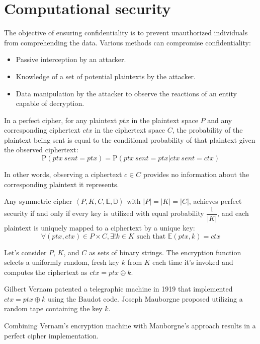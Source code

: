 \section{Computational security}

The objective of ensuring confidentiality is to prevent unauthorized individuals from comprehending the data. 
Various methods can compromise confidentiality:
\begin{itemize}
    \item Passive interception by an attacker.
    \item Knowledge of a set of potential plaintexts by the attacker.
    \item Data manipulation by the attacker to observe the reactions of an entity capable of decryption.
\end{itemize}

\begin{definition}
    In a perfect cipher, for any plaintext $ptx$ in the plaintext space $P$ and any corresponding ciphertext $ctx$ in the ciphertext space $C$, the probability of the plaintext being sent is equal to the conditional probability of that plaintext given the observed ciphertext:
    \[\text{P}(ptx\:sent=ptx)=\text{P}(ptx\:sent=ptx|ctx\:sent=ctx)\]
\end{definition}
In other words, observing a ciphertext $c \in C$ provides no information about the corresponding plaintext it represents.
\begin{theorem}[Shannon 1949]
    Any symmetric cipher $\left\langle P,K,C,\mathbb{E},\mathbb{D} \right\rangle $ with $\left\lvert P \right\rvert=\left\lvert K \right\rvert=\left\lvert C \right\rvert$, achieves perfect security if and only if every key is utilized with equal probability $\dfrac{1}{\left\lvert K\right\rvert }$, and each plaintext is uniquely mapped to a ciphertext by a unique key:
    \[\forall \left(ptx,ctx\right) \in P \times C, \exists !k \in K \text{ such that } \mathbb{E}\left(ptx,k\right)=ctx\]
\end{theorem}
\begin{example}
    Let's consider $P$, $K$, and $C$ as sets of binary strings. 
    The encryption function selects a uniformly random, fresh key $k$ from $K$ each time it's invoked and computes the ciphertext as $ctx=ptx \oplus k$.

    Gilbert Vernam patented a telegraphic machine in 1919 that implemented $ctx=ptx \oplus k$ using the Baudot code. 
    Joseph Mauborgne proposed utilizing a random tape containing the key $k$.

    Combining Vernam's encryption machine with Mauborgne's approach results in a perfect cipher implementation.
\end{example}

